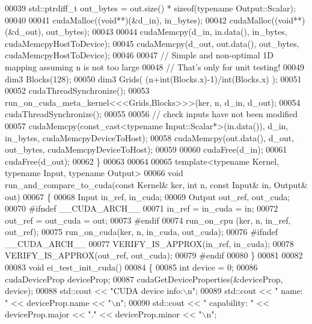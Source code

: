 \begin{DoxyCode}
00039   std::ptrdiff\_t out\_bytes = out.size() * \textcolor{keyword}{sizeof}(\textcolor{keyword}{typename} Output::Scalar);
00040   
00041   cudaMalloc((\textcolor{keywordtype}{void}**)(&d\_in),  in\_bytes);
00042   cudaMalloc((\textcolor{keywordtype}{void}**)(&d\_out), out\_bytes);
00043   
00044   cudaMemcpy(d\_in,  in.data(),  in\_bytes,  cudaMemcpyHostToDevice);
00045   cudaMemcpy(d\_out, out.data(), out\_bytes, cudaMemcpyHostToDevice);
00046   
00047   \textcolor{comment}{// Simple and non-optimal 1D mapping assuming n is not too large}
00048   \textcolor{comment}{// That's only for unit testing!}
00049   dim3 Blocks(128);
00050   dim3 Grids( (n+\textcolor{keywordtype}{int}(Blocks.x)-1)/\textcolor{keywordtype}{int}(Blocks.x) );
00051 
00052   cudaThreadSynchronize();
00053   run\_on\_cuda\_meta\_kernel<<<Grids,Blocks>>>(ker, n, d\_in, d\_out);
00054   cudaThreadSynchronize();
00055   
00056   \textcolor{comment}{// check inputs have not been modified}
00057   cudaMemcpy(const\_cast<typename Input::Scalar*>(in.data()),  d\_in,  in\_bytes,  cudaMemcpyDeviceToHost);
00058   cudaMemcpy(out.data(), d\_out, out\_bytes, cudaMemcpyDeviceToHost);
00059   
00060   cudaFree(d\_in);
00061   cudaFree(d\_out);
00062 \}
00063 
00064 
00065 \textcolor{keyword}{template}<\textcolor{keyword}{typename} Kernel, \textcolor{keyword}{typename} Input, \textcolor{keyword}{typename} Output>
00066 \textcolor{keywordtype}{void} run\_and\_compare\_to\_cuda(\textcolor{keyword}{const} Kernel& ker, \textcolor{keywordtype}{int} n, \textcolor{keyword}{const} Input& in, Output& out)
00067 \{
00068   Input  in\_ref,  in\_cuda;
00069   Output out\_ref, out\_cuda;
00070 \textcolor{preprocessor}{  #ifndef \_\_CUDA\_ARCH\_\_}
00071   in\_ref = in\_cuda = in;
00072   out\_ref = out\_cuda = out;
00073 \textcolor{preprocessor}{  #endif}
00074   run\_on\_cpu (ker, n, in\_ref,  out\_ref);
00075   run\_on\_cuda(ker, n, in\_cuda, out\_cuda);
00076 \textcolor{preprocessor}{  #ifndef \_\_CUDA\_ARCH\_\_}
00077   VERIFY\_IS\_APPROX(in\_ref, in\_cuda);
00078   VERIFY\_IS\_APPROX(out\_ref, out\_cuda);
00079 \textcolor{preprocessor}{  #endif}
00080 \}
00081 
00082 
00083 \textcolor{keywordtype}{void} ei\_test\_init\_cuda()
00084 \{
00085   \textcolor{keywordtype}{int} device = 0;
00086   cudaDeviceProp deviceProp;
00087   cudaGetDeviceProperties(&deviceProp, device);
00088   std::cout << \textcolor{stringliteral}{"CUDA device info:\(\backslash\)n"};
00089   std::cout << \textcolor{stringliteral}{"  name:                        "} << deviceProp.name << \textcolor{stringliteral}{"\(\backslash\)n"};
00090   std::cout << \textcolor{stringliteral}{"  capability:                  "} << deviceProp.major << \textcolor{stringliteral}{"."} << deviceProp.minor << \textcolor{stringliteral}{"\(\backslash\)n"};

\end{DoxyCode}
